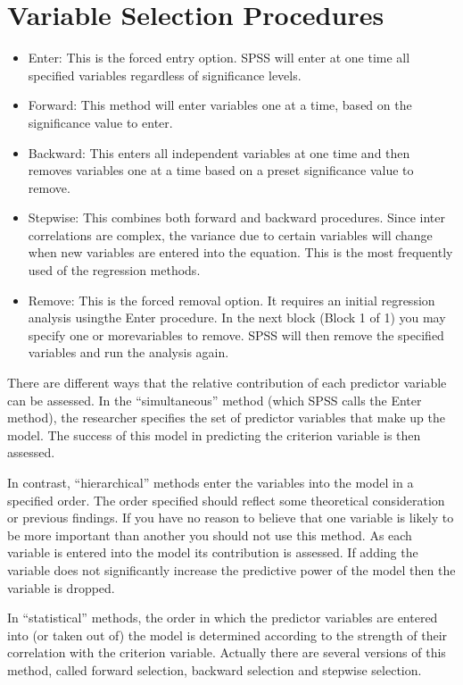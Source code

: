 \documentclass[a4paper,12pt]{article}
\begin{document}
	
	\tableofcontents
	
\section{Variable Selection Procedures}

\begin{itemize}
	\item Enter: This is the forced entry option. SPSS will enter at one time all specified variables regardless of significance levels.
	\item Forward: This method will enter variables one at a time, based on the significance value to enter.
	\item Backward: This enters all independent variables at one time and then removes variables one at a time based on a preset significance value to remove.
	\item Stepwise: This combines both forward and backward procedures. Since inter correlations are complex, the variance due to certain variables will change when new variables are entered into the equation. This is the most frequently used of the regression methods.
	\item Remove: This is the forced removal option. It requires an initial regression analysis usingthe Enter procedure. In the next block (Block 1 of 1) you may specify one or morevariables to remove. SPSS will then remove the specified variables and run the analysis again.
\end{itemize}
There are different ways that the relative contribution of each predictor variable can be assessed. In the “simultaneous” method (which SPSS calls the Enter method), the researcher specifies the set of predictor variables that make up the model. The success of this model in predicting the criterion variable is then assessed.

In contrast, “hierarchical” methods enter the variables into the model in a specified order. The order specified should reflect some theoretical consideration or previous
findings. If you have no reason to believe that one variable is likely to be more important than another you should not use this method. As each variable is entered into the model its contribution is assessed. If adding the variable does not significantly increase the predictive power of the model then the variable is
dropped.

In “statistical” methods, the order in which the predictor variables are entered into (or taken out of) the model is determined according to the strength of their correlation with the criterion variable. Actually there are several versions of this method, called forward selection, backward selection and stepwise selection.
\end{document}

